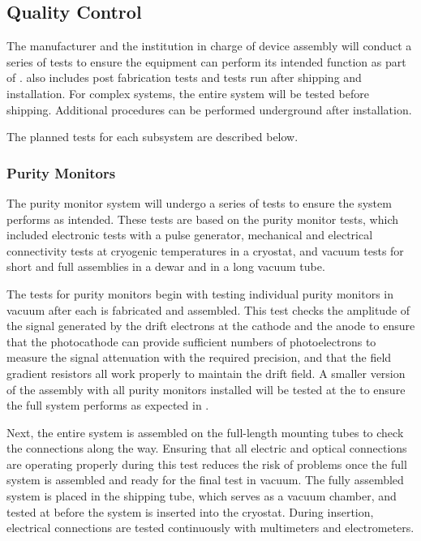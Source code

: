\subsection{ Quality Control}

The manufacturer and the institution in charge of device assembly will
conduct a series of tests to ensure the equipment can perform its
intended function as part of .  also includes post fabrication
tests and tests run after shipping and installation. For complex
systems, the entire system will be tested before shipping. Additional
 procedures can be performed underground after installation.

The planned tests for each subsystem are described below.

\subsubsection{Purity Monitors}

The purity monitor system will undergo a series of tests to ensure the
system performs as intended.  These tests %
are based on the 
purity monitor  tests, which included electronic tests with a pulse
generator, mechanical and electrical connectivity tests at cryogenic
temperatures in a cryostat, and vacuum tests for short and full
assemblies in a dewar and in a long vacuum tube.

The  tests for  purity monitors begin with testing
individual purity monitors in vacuum after each is fabricated and
assembled. This test checks the amplitude of the signal generated by
the drift electrons at the cathode and the anode to ensure that the
photocathode can provide sufficient numbers of photoelectrons to
measure the signal attenuation with the required precision, and that
the field gradient resistors all work properly to maintain the drift
field. A smaller version of the assembly with all purity monitors
installed will be tested at the  to ensure the full system
performs as expected in .

Next, the entire system is assembled on the full-length mounting tubes
to check the connections along the way. Ensuring that all electric and
optical connections are operating properly during this test reduces
the risk of problems once the full system is assembled and ready for
the final test in vacuum. The fully assembled system is placed in the
shipping tube, which serves as a vacuum chamber, and tested at
 before the system is inserted into the cryostat. During
insertion, electrical connections are tested continuously with
multimeters and electrometers.

